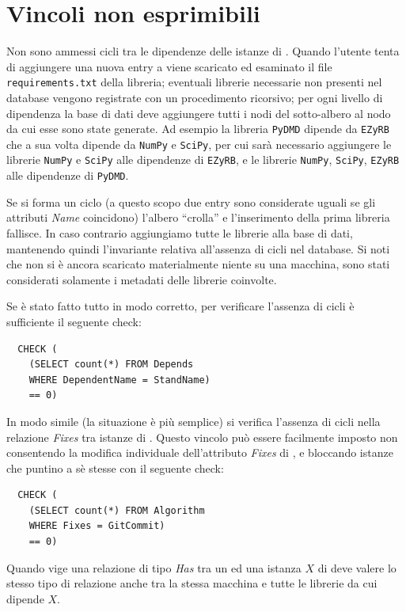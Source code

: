 \documentclass{article}
\begin{document}
\section{Vincoli non esprimibili}
Non sono ammessi cicli tra le dipendenze delle istanze di . Quando l'utente tenta di aggiungere una nuova entry a  viene scaricato ed esaminato il file \texttt{requirements.txt} della libreria; eventuali librerie necessarie non presenti nel database vengono registrate con un procedimento ricorsivo; per ogni livello di dipendenza la base di dati deve aggiungere tutti i nodi del sotto-albero al nodo da cui esse sono state generate. Ad esempio la libreria \texttt{PyDMD} dipende da \texttt{EZyRB} che a sua volta dipende da \texttt{NumPy} e \texttt{SciPy}, per cui sarà necessario aggiungere le librerie \texttt{NumPy} e \texttt{SciPy} alle dipendenze di \texttt{EZyRB}, e le librerie \texttt{NumPy}, \texttt{SciPy}, \texttt{EZyRB} alle dipendenze di \texttt{PyDMD}.

Se si forma un ciclo (a questo scopo due entry sono considerate uguali se gli attributi \emph{Name} coincidono) l'albero ``crolla'' e l'inserimento della prima libreria fallisce. In caso contrario aggiungiamo tutte le librerie alla base di dati, mantenendo quindi l'invariante relativa all'assenza di cicli nel database. Si noti che non si è ancora scaricato materialmente niente su una macchina, sono stati considerati solamente i metadati delle librerie coinvolte.

Se è stato fatto tutto in modo corretto, per verificare l'assenza di cicli è sufficiente il seguente check:

\begin{verbatim}
  CHECK (
    (SELECT count(*) FROM Depends
    WHERE DependentName = StandName)
    == 0)
\end{verbatim}

In modo simile (la situazione è più semplice) si verifica l'assenza di cicli nella relazione \emph{Fixes} tra istanze di . Questo vincolo può essere facilmente imposto non consentendo la modifica individuale dell'attributo \emph{Fixes} di , e bloccando istanze che puntino a sè stesse con il seguente check:

\begin{verbatim}
  CHECK (
    (SELECT count(*) FROM Algorithm
    WHERE Fixes = GitCommit)
    == 0)
\end{verbatim}

Quando vige una relazione di tipo \emph{Has} tra un  ed una istanza $X$ di  deve valere lo stesso tipo di relazione anche tra la stessa macchina e tutte le librerie da cui dipende $X$.
\end{document}
